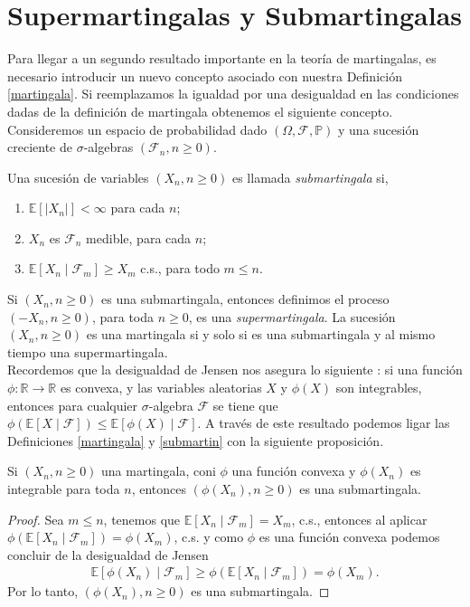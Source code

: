 \section{Supermartingalas y Submartingalas}
Para llegar a un segundo resultado importante en la teoría de martingalas, es necesario introducir un nuevo concepto asociado con nuestra Definición \ref{martingala}. Si reemplazamos la igualdad por una desigualdad en las condiciones dadas de la definición de martingala obtenemos el siguiente concepto. \\

Consideremos un espacio de probabilidad dado $(\Omega, \mathcal{F}, \mathbb{P})$ y una sucesión creciente de $\sigma$-algebras $(\mathcal{F}_n, n \geq 0)$.

\begin{definition}
\label{submartin}
	Una sucesión de variables $(X_n, n \geq 0)$ es llamada \emph{submartingala} si,
	\begin{enumerate}
		\item $\mathbb{E}[|X_n|] < \infty$ para cada $n$;
		\item $X_n$ es $\mathcal{F}_n$ medible, para cada $n$;
		\item $\mathbb{E}[X_n \mid \mathcal{F}_m] \geq X_m$ c.s., para todo $m \leq n$.
	\end{enumerate}
\end{definition}

Si $(X_n, n \geq 0)$ es una submartingala, entonces definimos el proceso $(- X_n, n \geq 0)$, para toda $n \geq 0$, es una \emph{supermartingala}. La sucesión $(X_n, n \geq 0)$ es una martingala si y solo si es una submartingala y al mismo tiempo una supermartingala. \\

Recordemos que la desigualdad de Jensen nos asegura lo siguiente \cite[p.~205]{jacodprotter}: si una función $\phi: \mathbb{R} \rightarrow \mathbb{R}$ es convexa, y las variables aleatorias $X$ y $\phi(X)$ son integrables, entonces para cualquier $\sigma$-algebra $\mathcal{F}$ se tiene que $\phi(\mathbb{E}[X \mid \mathcal{F}]) \leq \mathbb{E}[\phi(X) \mid \mathcal{F}]$. A través de este resultado podemos ligar las Definiciones \ref{martingala} y \ref{submartin} con la siguiente proposición.

\begin{proposition}
\label{convexa}
	Si $(X_n, n \geq 0)$ una martingala, coni $\phi$ una función convexa y $\phi(X_n)$ es integrable para toda $n$, entonces $(\phi(X_n), n \geq 0)$ es una submartingala.
\end{proposition}
\begin{proof}
	Sea $m \leq n$, tenemos que $\mathbb{E}[X_n \mid \mathcal{F}_m] = X_m$, c.s., entonces al aplicar $\phi(\mathbb{E}[X_n \mid \mathcal{F}_m]) = \phi(X_m)$, c.s. y como $\phi$ es una función convexa podemos concluir de la desigualdad de Jensen
	\begin{align*}
		\mathbb{E}[\phi(X_n) \mid \mathcal{F}_m] \geq \phi(\mathbb{E}[X_n \mid \mathcal{F}_m]) = \phi(X_m).
	\end{align*}
	Por lo tanto, $(\phi(X_n), n \geq 0)$ es una submartingala.
\end{proof}

